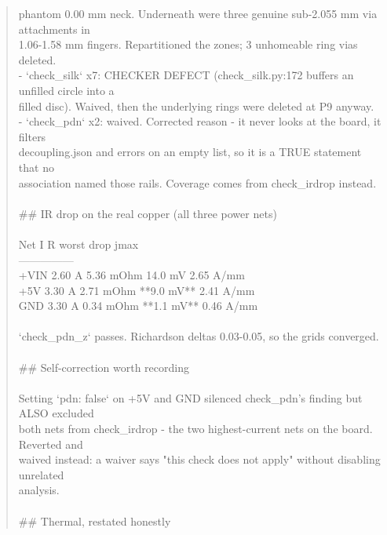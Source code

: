 \documentclass[11pt,a4paper]{article}
\begin{document}
\begin{quote}
  phantom 0.00 mm neck. Underneath were three genuine sub-2.055 mm via attachments in\\
  1.06-1.58 mm fingers. Repartitioned the zones; 3 unhomeable ring vias deleted.\\
- `check\_silk` x7: CHECKER DEFECT (check\_silk.py:172 buffers an unfilled circle into a\\
  filled disc). Waived, then the underlying rings were deleted at P9 anyway.\\
- `check\_pdn` x2: waived. Corrected reason - it never looks at the board, it filters\\
  decoupling.json and errors on an empty list, so it is a TRUE statement that no\\
  association named those rails. Coverage comes from check\_irdrop instead.\\
~\\
\#\# IR drop on the real copper (all three power nets)\\
~\\
\textbar{} Net \textbar{} I \textbar{} R \textbar{} worst drop \textbar{} jmax \textbar{}\\
\textbar{}---\textbar{}---\textbar{}---\textbar{}---\textbar{}---\textbar{}\\
\textbar{} +VIN \textbar{} 2.60 A \textbar{} 5.36 mOhm \textbar{} 14.0 mV \textbar{} 2.65 A/mm \textbar{}\\
\textbar{} +5V \textbar{} 3.30 A \textbar{} 2.71 mOhm \textbar{} {*}{*}9.0 mV{*}{*} \textbar{} 2.41 A/mm \textbar{}\\
\textbar{} GND \textbar{} 3.30 A \textbar{} 0.34 mOhm \textbar{} {*}{*}1.1 mV{*}{*} \textbar{} 0.46 A/mm \textbar{}\\
~\\
`check\_pdn\_z` passes. Richardson deltas 0.03-0.05, so the grids converged.\\
~\\
\#\# Self-correction worth recording\\
~\\
Setting `pdn: false` on +5V and GND silenced check\_pdn's finding but ALSO excluded\\
both nets from check\_irdrop - the two highest-current nets on the board. Reverted and\\
waived instead: a waiver says "this check does not apply" without disabling unrelated\\
analysis.\\
~\\
\#\# Thermal, restated honestly\\

\end{quote}
\end{document}
